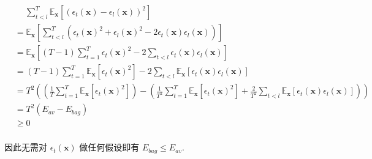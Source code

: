 \documentclass[answers]{exam}  %
\begin{document}
\begin{questions}
\begin{solution}
\begin{enumerate}
            $$
              \begin{aligned}
                 & \quad\ \sum_{t < l}^{T}\mathbb{E}_{\bm{x}}[(\epsilon_{t}(\bm{x})-\epsilon_{l}(\bm{x}))^{2}]                                                                                                                                                                 \\
                 & = \mathbb{E}_{\bm{x}}[\sum_{t < l}^{T}(\epsilon_{t}(\bm{x})^{2}+\epsilon_{l}(\bm{x})^{2} - 2\epsilon_{t}(\bm{x})\epsilon_{l}(\bm{x}))]                                                                                                                      \\
                 & = \mathbb{E}_{\bm{x}}[(T-1)\sum_{t=1}^{T}\epsilon_{t}(\bm{x})^{2} - 2\sum_{t < l}\epsilon_{t}(\bm{x})\epsilon_{l}(\bm{x})]                                                                                                                                  \\
                 & = (T-1)\sum_{t=1}^{T}\mathbb{E}_{\bm{x}}[\epsilon_{t}(\bm{x})^{2}] - 2\sum_{t < l}\mathbb{E}_{\bm{x}}[\epsilon_{t}(\bm{x})\epsilon_{l}(\bm{x})]                                                                                                             \\
                 & = T^{2}((\frac{1}{T}\sum_{t=1}^{T}\mathbb{E}_{\bm{x}}[\epsilon_{t}(\bm{x})^{2}]) - (\frac{1}{T^{2}}\sum_{t=1}^{T}\mathbb{E}_{\bm{x}}[\epsilon_{t}(\bm{x})^{2}] + \frac{2}{T^{2}}\sum_{t < l}\mathbb{E}_{\bm{x}}[\epsilon_{t}(\bm{x})\epsilon_{l}(\bm{x})])) \\
                 & = T^{2}(E_{av} - E_{bag})                                                                                                                                                                                                                                   \\
                 & \ge 0                                                                                                                                                                                                                                                       \\
              \end{aligned}
            $$

            因此无需对 $\epsilon_{t}(\bm{x})$ 做任何假设即有 $E_{bag} \le E_{av}$.
    \end{enumerate}
  \end{solution}


\end{questions}
\end{document}
